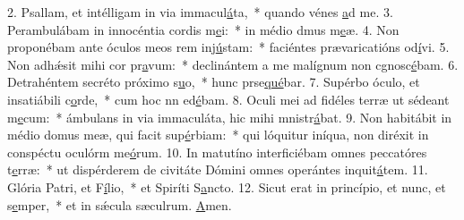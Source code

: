 2. Psallam, et intélligam in via immacul\uline{á}ta,~* quando vénes \uline{a}d me.
3. Perambulábam in innocéntia cordis m\uline{e}i:~* in médio dmus m\uline{e}æ.
4. Non proponébam ante óculos meos rem inj\uline{ú}stam:~* faciéntes prævaricatións od\uline{í}vi.
5. Non adhǽsit mihi cor pr\uline{a}vum:~* declinántem a me malígnum non cgnosc\uline{é}bam.
6. Detrahéntem secréto próximo s\uline{u}o,~* hunc prse\uline{qué}bar.
7. Supérbo óculo, et insatiábili c\uline{o}rde,~* cum hoc nn ed\uline{é}bam.
8. Oculi mei ad fidéles terræ ut sédeant m\uline{e}cum:~* ámbulans in via immaculáta, hic mihi mnistr\uline{á}bat.
9. Non habitábit in médio domus meæ, qui facit sup\uline{é}rbiam:~* qui lóquitur iníqua, non diréxit in conspéctu oculórm me\uline{ó}rum.
10. In matutíno interficiébam omnes peccatóres t\uline{e}rræ:~* ut dispérderem de civitáte Dómini omnes operántes inquit\uline{á}tem.
11. Glória Patri, et F\uline{í}lio,~* et Spiríti S\uline{a}ncto.
12. Sicut erat in princípio, et nunc, et s\uline{e}mper,~* et in sǽcula sæculrum. \uline{A}men.
